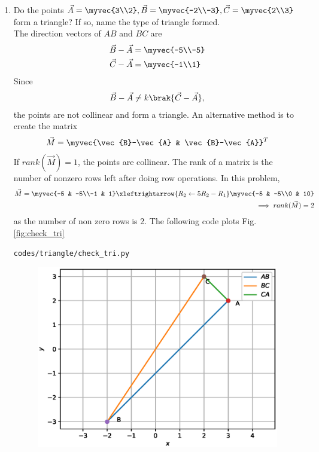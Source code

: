 \begin{enumerate}[label=\arabic*.,ref=\thesubsection.\theenumi]
%
\item Do the points $\vec{A}=\myvec{3\\2}, \vec{B}=\myvec{-2\\-3}, \vec{C}=\myvec{2\\3} $ form a triangle?  If so, name the type of triangle formed.
\label{prob:tri_exam_coll_pts}
%
\\
\solution The direction vectors of $AB$ and $BC$ are 
\begin{align}
\label{eq:tri_geo_ex_baorth}
\vec{B}-\vec{A} &= \myvec{-5\\-5}
\\
\vec{C}-\vec{A} &= \myvec{-1\\1}
\label{eq:tri_geo_ex_caorth}
\end{align}
%
Since 
%
\begin{align}
\vec{B}-\vec{A} \ne k\brak{\vec{C}-\vec{A}},
\end{align}
%
the points are not collinear and form a triangle.  An alternative method is to create the matrix
\begin{align}
\label{eq:tri_geo_ex_diff_mat}
\vec{M} = \myvec{\vec{B}-\vec{A} & \vec{B}-\vec{A}}^T 
\end{align}
%
If $rank(\vec{M}) = 1$, the points are collinear.  The rank of a matrix is the number of nonzero rows left after doing row operations.  In this problem, 
%
\begin{align}
\vec{M} = \myvec{-5 & -5\\-1 & 1}\xleftrightarrow {R_2\leftarrow 5R_2-R_1}\myvec{-5 & -5\\0 & 10}
\\
\implies rank(\vec{M}) = 2
\end{align}
%
as the number of non zero rows is 2.
The following code plots Fig. \ref{fig:check_tri}
%
\begin{lstlisting}
codes/triangle/check_tri.py
\end{lstlisting}
%
\begin{figure}[!ht]
\includegraphics[width=\columnwidth]{./triangle/figs/check_tri.eps}

\end{figure}
\end{enumerate}
